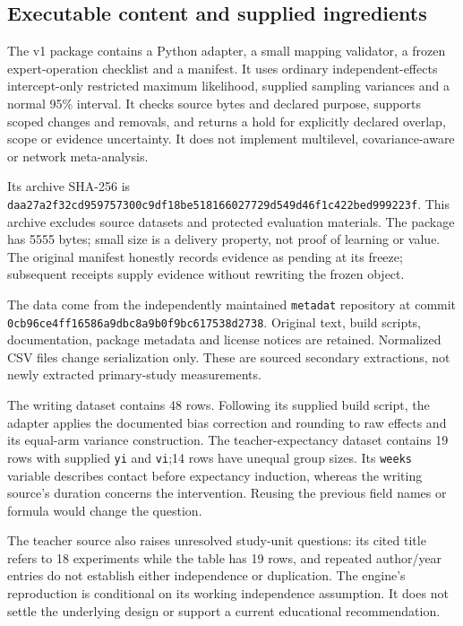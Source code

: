 \subsection{Executable content and supplied ingredients}

The v1 package contains a Python adapter, a small mapping validator, a frozen expert-operation checklist and a manifest. It uses ordinary independent-effects intercept-only restricted maximum likelihood, supplied sampling variances and a normal 95\% interval. It checks source bytes and declared purpose, supports scoped changes and removals, and returns a hold for explicitly declared overlap, scope or evidence uncertainty. It does not implement multilevel, covariance-aware or network meta-analysis.

Its archive SHA-256 is {\footnotesize\nolinkurl{daa27a2f32cd959757300c9df18be518166027729d549d46f1c422bed999223f}}. This archive excludes source datasets and protected evaluation materials. The package has 5555 bytes; small size is a delivery property, not proof of learning or value. The original manifest honestly records evidence as pending at its freeze; subsequent receipts supply evidence without rewriting the frozen object.

The data come from the independently maintained \texttt{metadat} repository at commit \nolinkurl{0cb96ce4ff16586a9dbc8a9b0f9bc617538d2738}. Original text, build scripts, documentation, package metadata and license notices are retained. Normalized CSV files change serialization only. These are sourced secondary extractions, not newly extracted primary-study measurements.\citep{metadat,bangert,raud}

The writing dataset contains 48 rows. Following its supplied build script, the adapter applies the documented bias correction and rounding to raw effects and its equal-arm variance construction. The teacher-expectancy dataset contains 19 rows with supplied \texttt{yi} and \texttt{vi};14 rows have unequal group sizes. Its \texttt{weeks} variable describes contact before expectancy induction, whereas the writing source's duration concerns the intervention. Reusing the previous field names or formula would change the question.

The teacher source also raises unresolved study-unit questions: its cited title refers to 18 experiments while the table has 19 rows, and repeated author/year entries do not establish either independence or duplication. The engine's reproduction is conditional on its working independence assumption. It does not settle the underlying design or support a current educational recommendation.

